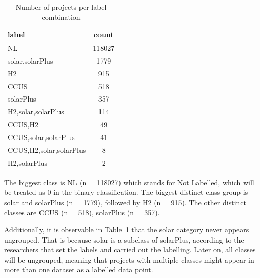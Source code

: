 \documentclass[11pt]{article}
\begin{document}
\begin{table}
  \centering
  \begin{tabular}{lc}
      \hline
        label & count \\
        \hline
        NL                    & 118027 \\
        solar,solarPlus       & 1779   \\
        H2                    & 915    \\
        CCUS                  & 518    \\
        solarPlus             & 357    \\
        H2,solar,solarPlus    & 114    \\
        CCUS,H2               & 49     \\
        CCUS,solar,solarPlus  & 41     \\
        CCUS,H2,solar,solarPlus & 8    \\
        H2,solarPlus          & 2      \\\hline
  \end{tabular}
  \caption{Number of projects per label combination}\label{table:labels}
\end{table}

The biggest class is NL (n = 118027) which stands for Not Labelled, which will be treated as 0 in the binary classification. The biggest distinct class group is solar and solarPlus (n = 1779), followed by H2 (n = 915). The other distinct classes are CCUS (n = 518),
solarPlus (n = 357).

Additionally, it is observable in Table~\ref{table:labels} that the solar category never appears ungrouped. That is because solar is a subclass of solarPlus, according to the researchers that set the labels and carried out the labelling.
Later on, all classes will be ungrouped, meaning that projects with multiple classes might appear in more than one dataset as a labelled data point.
\end{document}
